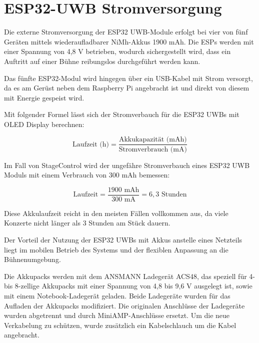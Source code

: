 \newpage
\section{ESP32-UWB Stromversorgung}
Die externe Stromversorgung der ESP32 UWB-Module erfolgt bei vier von fünf Geräten mittels wiederaufladbarer NiMh-Akkus 1900 mAh. Die ESPs werden mit einer Spannung von 4,8 V betrieben, wodurch sichergestellt wird, dass ein Auftritt auf einer Bühne reibungslos durchgeführt werden kann.  

Das fünfte ESP32-Modul wird hingegen über ein USB-Kabel mit Strom versorgt, da es am Gerüst neben dem Raspberry Pi angebracht ist und direkt von diesem mit Energie gespeist wird.

Mit folgender Formel lässt sich der Stromverbauch für die ESP32 UWBs mit OLED Display berechnen:

\[
\text{Laufzeit (h)} = \frac{\text{Akkukapazität (mAh)}}{\text{Stromverbrauch (mA)}}
\]

Im Fall von StageControl wird der ungefähre Stromverbauch eines ESP32 UWB Moduls mit einem Verbrauch von 300 mAh bemessen:

\[
\text{Laufzeit} = \frac{1900 \text{ mAh}}{300 \text{ mA}} = 6,3 \text{ Stunden}
\]

Diese Akkulaufzeit reicht in den meisten Fällen vollkommen aus, da viele Konzerte nicht länger als 3 Stunden am Stück dauern.

Der Vorteil der Nutzung der ESP32 UWBs mit Akkus anstelle eines Netzteils liegt im mobilen Betrieb des Systems und der flexiblen Anpassung an die Bühnenumgebung.

Die Akkupacks werden mit dem ANSMANN Ladegerät ACS48, das speziell für 4- bis 8-zellige Akkupacks mit einer Spannung von 4,8 bis 9,6 V ausgelegt ist, sowie mit einem Notebook-Ladegerät geladen. Beide Ladegeräte wurden für das Aufladen der Akkupacks modifiziert. Die originalen Anschlüsse der Ladegeräte wurden abgetrennt und durch MiniAMP-Anschlüsse ersetzt. Um die neue Verkabelung zu schützen, wurde zusätzlich ein Kabelschlauch um die Kabel angebracht.  

